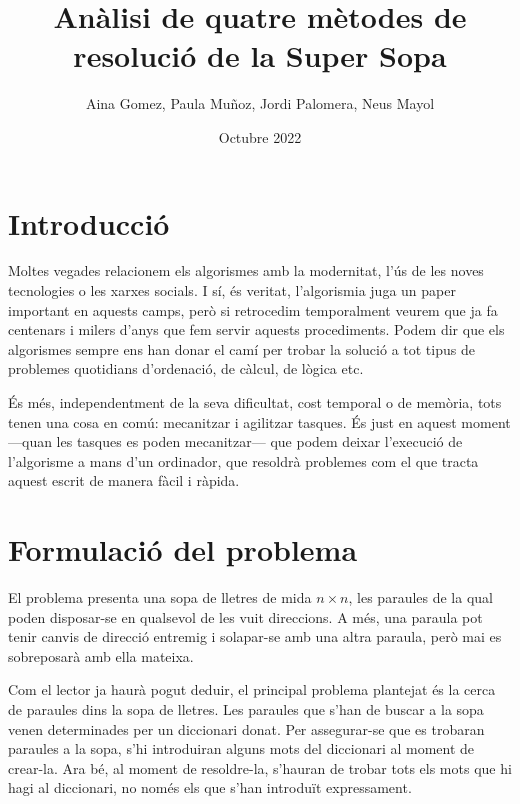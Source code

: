 \documentclass[titlepage]{article}
\title{Anàlisi de quatre mètodes de resolució de la Super Sopa}
\author{Aina Gomez, Paula Muñoz, Jordi Palomera, Neus Mayol}
\date{Octubre 2022}
\begin{document}
\maketitle
\clearpage
\renewcommand{\contentsname}{Índex}
\tableofcontents
\clearpage

\section{Introducció}
\par
Moltes vegades relacionem els algorismes amb la modernitat, l'ús de les noves tecnologies o les xarxes socials. I sí, és veritat, l'algorismia juga un paper important en aquests camps, 
però si retrocedim temporalment veurem que ja fa centenars i milers d'anys que fem servir aquests procediments. Podem dir que els algorismes sempre ens han donar el camí per trobar la solució a tot tipus de problemes quotidians d'ordenació, de càlcul, de lògica etc.\newline\par

\par
És més, independentment de la seva dificultat, cost temporal o de memòria, tots tenen una cosa en comú: mecanitzar i agilitzar tasques. És just en aquest moment —quan les tasques es poden mecanitzar— que podem deixar l'execució de l'algorisme a mans d'un ordinador, que resoldrà problemes com el que tracta aquest escrit de manera fàcil i ràpida.

\section{Formulació del problema}
El problema presenta una sopa de lletres de mida \begin{math}n\times n\end{math}, les paraules de la qual poden disposar-se en qualsevol de les vuit direccions. A més, una paraula pot tenir canvis de direcció entremig i solapar-se amb una altra paraula, però mai es sobreposarà amb ella mateixa.\newline\par
Com el lector ja haurà pogut deduir, el principal problema plantejat és la cerca de paraules dins la sopa de lletres. Les paraules que s'han de buscar a la sopa venen determinades per un diccionari donat. Per assegurar-se que es trobaran paraules a la sopa, s'hi introduiran alguns mots del diccionari al moment de  crear-la. Ara bé, al moment de resoldre-la, s'hauran de trobar tots els mots que hi hagi al diccionari, no només els que s'han introduït expressament.\par
\end{document}
